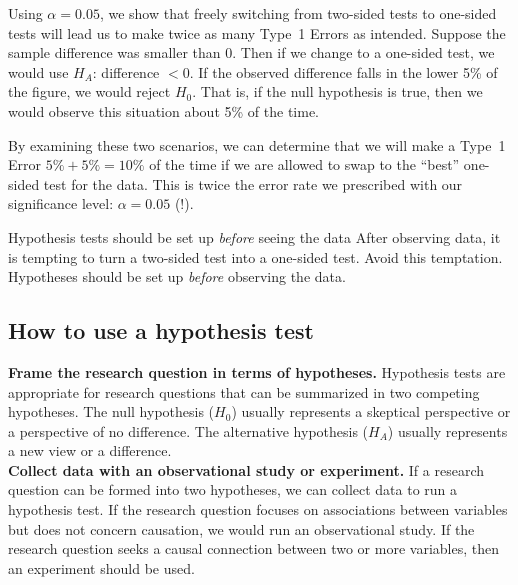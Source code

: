 \begin{example}{Using $\alpha=0.05$, we show that freely switching from two-sided tests to one-sided tests will lead us to make twice as many Type~1 Errors as intended.}
Suppose the sample difference was smaller than 0. Then if we change to a one-sided test, we would use $H_A$: difference $< 0$. If the observed difference falls in the lower 5\% of the figure, we would reject $H_0$. That is, if the null hypothesis is true, then we would observe this situation about 5\% of the time.

By examining these two scenarios, we can determine that we will make a Type~1 Error $5\%+5\%=10\%$ of the time if we are allowed to swap to the ``best'' one-sided test for the data. This is twice the error rate we prescribed with our significance level: $\alpha=0.05$ (!).
\end{example}

\begin{caution}{Hypothesis tests should be set up \emph{before} seeing the data}
{After observing data, it is tempting to turn a two-sided test into a one-sided test. Avoid this temptation. Hypotheses should be set up \emph{before} observing the data.}
\end{caution}




\subsection{How to use a hypothesis test}

\noindent\textbf{Frame the research question in terms of hypotheses.} Hypothesis tests are appropriate for research questions that can be summarized in two competing hypotheses. The null hypothesis ($H_0$) usually represents a skeptical perspective or a perspective of no difference. The alternative hypothesis ($H_A$) usually represents a new view or a difference. \\

\noindent\textbf{Collect data with an observational study or experiment.} If a research question can be formed into two hypotheses, we can collect data to run a hypothesis test. If the research question focuses on associations between variables but does not concern causation, we would run an observational study. If the research question seeks a causal connection between two or more variables, then an experiment should be used. \\


